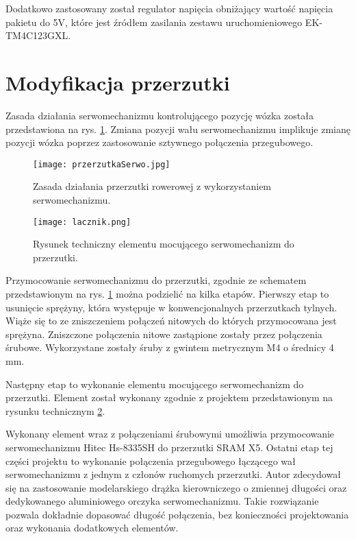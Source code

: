 Dodatkowo zastosowany został regulator napięcia obniżający wartość napięcia pakietu do 5V, które jest źródłem zasilania zestawu uruchomieniowego EK-TM4C123GXL.



\section{Modyfikacja przerzutki}
 Zasada działania serwomechanizmu kontrolującego pozycję wózka została przedstawiona na rys. \ref{fig:przerzutkaSerwo}. Zmiana pozycji wału serwomechanizmu implikuje zmianę pozycji wózka poprzez zastosowanie sztywnego połączenia przegubowego.
 \begin{figure}[h]
    \centering
    \texttt{[image: przerzutkaSerwo.jpg]}
    \caption{Zasada działania przerzutki rowerowej z wykorzystaniem serwomechanizmu.}
    \label{fig:przerzutkaSerwo}
\end{figure}

\begin{figure}[h]
    \centering
    \texttt{[image: lacznik.png]}
    \caption{Rysunek techniczny elementu mocującego serwomechanizm do przerzutki.}
    \label{fig:lacznik}
\end{figure}

Przymocowanie serwomechanizmu do przerzutki, zgodnie ze schematem przedstawionym na rys. \ref{fig:przerzutkaSerwo}  można podzielić na kilka etapów.
Pierwszy etap to usunięcie sprężyny, która występuje w konwencjonalnych przerzutkach tylnych. Wiąże się to ze zniszczeniem połączeń nitowych do których przymocowana jest sprężyna. Zniszczone połączenia nitowe zastąpione zostały przez połączenia śrubowe. Wykorzystane zostały śruby z gwintem metrycznym M4 o średnicy 4 mm.

Następny etap to wykonanie elementu mocującego serwomechanizm do przerzutki. Element został wykonany zgodnie z projektem przedstawionym na rysunku technicznym \ref{fig:lacznik}.


Wykonany element wraz z połączeniami śrubowymi umożliwia przymocowanie serwomechanizmu Hitec Hs-8335SH do przerzutki SRAM X5. Ostatni etap tej części projektu to wykonanie połączenia przegubowego łączącego wał serwomechanizmu z jednym z członów ruchomych przerzutki. Autor zdecydował się na zastosowanie modelarskiego drążka kierowniczego o zmiennej długości oraz dedykowanego aluminiowego orczyka serwomechanizmu. Takie rozwiązanie pozwala dokładnie dopasować długość  połączenia, bez konieczności projektowania oraz wykonania dodatkowych elementów.

